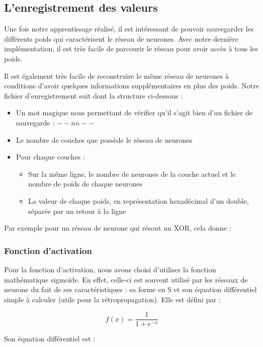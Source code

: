 \documentclass[11pt]{report}
\begin{document}
\subsection{L'enregistrement des valeurs}

Une fois notre apprentissage réalisé, il est intéressant de pouvoir sauvegarder les différents poids qui caractérisent le réseau de neurones. Avec notre dernière implémentation, il est très facile de parcourir le réseau pour avoir accès à tous les poids. 

Il est également très facile de reconstruire le même réseau de neurones à conditions d'avoir quelques informations supplémentaires en plus des poids. Notre fichier d'enregistrement suit dont la structure ci-dessous :

\begin{itemize}
\item Un mot magique nous permettant de vérifier qu'il s'agit bien d'un fichier de sauvegarde : $--nn--$
\item Le nombre de couches que possède le réseau de neurones
\item Pour chaque couches :
\begin{itemize}
\item Sur la même ligne, le nombre de neurones de la couche actuel et le nombre de poids de chaque neurones
\item La valeur de chaque poids, en représentation hexadécimal d'un double, séparée par un retour à la ligne
\end{itemize}
\end{itemize}

Par exemple pour un réseau de neurone qui résout un XOR, cela donne : 

\bigskip


\subsubsection{Fonction d'activation}

Pour la fonction d'activation, nous avons choisi d'utiliser la fonction mathématique sigmoïde. En effet, celle-ci est souvent utilisé par les réseaux de neurone du fait de ses caractéristiques : sa forme en S et son équation différentiel simple à calculer (utile pour la rétropropagation). Elle est défini par :

\[ f\left( x\right) = \dfrac{1}{1+e^{-x}} \]

Son équation différentiel est :
\end{document}
